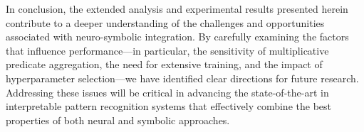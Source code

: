 \documentclass[11pt]{article}
\begin{document}
In conclusion, the extended analysis and experimental results presented herein contribute to a deeper understanding of the challenges and opportunities associated with neuro-symbolic integration. By carefully examining the factors that influence performance—in particular, the sensitivity of multiplicative predicate aggregation, the need for extensive training, and the impact of hyperparameter selection—we have identified clear directions for future research. Addressing these issues will be critical in advancing the state-of-the-art in interpretable pattern recognition systems that effectively combine the best properties of both neural and symbolic approaches.
\end{document}
